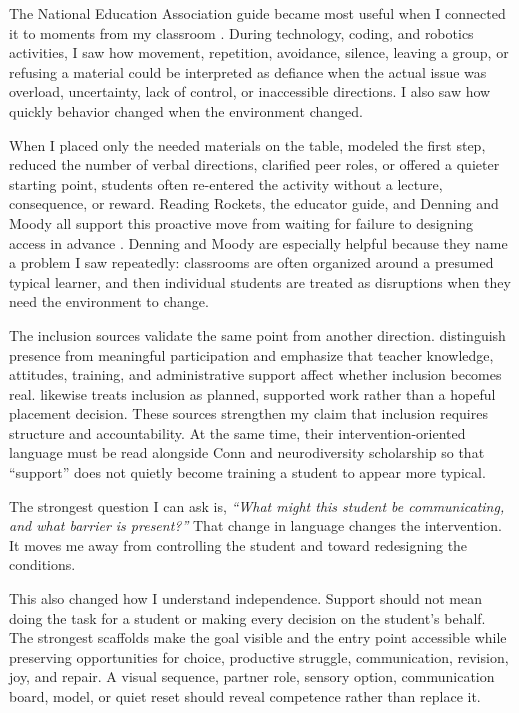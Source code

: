 
The National Education Association guide became most useful when I connected it to moments from my classroom \citep{nea2020guide}. During technology, coding, and robotics activities, I saw how movement, repetition, avoidance, silence, leaving a group, or refusing a material could be interpreted as defiance when the actual issue was overload, uncertainty, lack of control, or inaccessible directions. I also saw how quickly behavior changed when the environment changed.

When I placed only the needed materials on the table, modeled the first step, reduced the number of verbal directions, clarified peer roles, or offered a quieter starting point, students often re-entered the activity without a lecture, consequence, or reward. Reading Rockets, the educator guide, and Denning and Moody all support this proactive move from waiting for failure to designing access in advance \citep{readingRocketsASD,iris2016asd,denningMoody2018}. Denning and Moody are especially helpful because they name a problem I saw repeatedly: classrooms are often organized around a presumed typical learner, and then individual students are treated as disruptions when they need the environment to change.

The inclusion sources validate the same point from another direction. \citet{bock2016inclusion} distinguish presence from meaningful participation and emphasize that teacher knowledge, attitudes, training, and administrative support affect whether inclusion becomes real. \citet{smith2011inclusion} likewise treats inclusion as planned, supported work rather than a hopeful placement decision. These sources strengthen my claim that inclusion requires structure and accountability. At the same time, their intervention-oriented language must be read alongside Conn and neurodiversity scholarship so that ``support'' does not quietly become training a student to appear more typical.

The strongest question I can ask is, \textit{``What might this student be communicating, and what barrier is present?''} That change in language changes the intervention. It moves me away from controlling the student and toward redesigning the conditions.

This also changed how I understand independence. Support should not mean doing the task for a student or making every decision on the student's behalf. The strongest scaffolds make the goal visible and the entry point accessible while preserving opportunities for choice, productive struggle, communication, revision, joy, and repair. A visual sequence, partner role, sensory option, communication board, model, or quiet reset should reveal competence rather than replace it.

